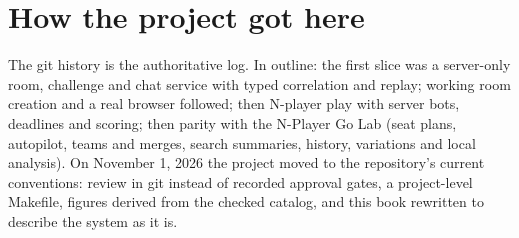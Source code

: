 \documentclass[11pt,oneside]{book}
\begin{document}
\appendix
{}

\chapter{How the project got here}
The git history is the authoritative log. In outline: the first slice was a
server-only room, challenge and chat service with typed correlation and
replay; working room creation and a real browser followed; then N-player play
with server bots, deadlines and scoring; then parity with the N-Player Go Lab
(seat plans, autopilot, teams and merges, search summaries, history,
variations and local analysis). On November 1, 2026 the project moved to the
repository's current conventions: review in git instead of recorded approval
gates, a project-level Makefile, figures derived from the checked catalog, and
this book rewritten to describe the system as it is.
\end{document}
